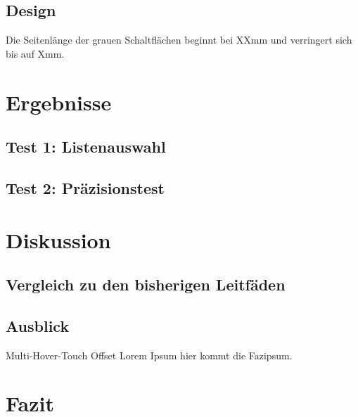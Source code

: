 \documentclass[a4paper,12pt,bibliography=totoc]{scrreprt}%
\begin{document}
\section{Design}
Die Seitenlänge der grauen Schaltflächen beginnt bei XXmm und verringert sich bis auf Xmm.

\chapter{Ergebnisse}


\section{Test 1: Listenauswahl}


\section{Test 2: Präzisionstest}


\chapter{Diskussion}

\section{Vergleich zu den bisherigen Leitfäden}

\section{Ausblick}
Multi-Hover-Touch
Offset
Lorem Ipsum hier kommt die Fazipsum.

\chapter{Fazit}
\end{document}
